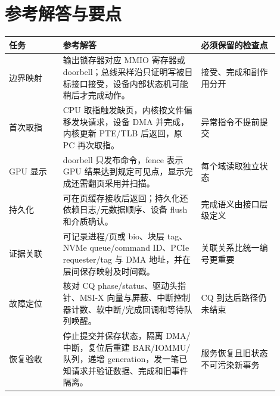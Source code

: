 \section*{参考解答与要点}

\begin{longtable}{L{0.18\linewidth}L{0.46\linewidth}L{0.26\linewidth}}
\toprule
任务 & 参考解答 & 必须保留的检查点 \\
\midrule
边界映射 & 输出锁存器对应 MMIO 寄存器或 doorbell；总线采样沿只证明写被目标接口接受，设备内部状态机可能稍后才完成动作。 & 接受、完成和副作用分开 \\
首次取指 & CPU 取指触发缺页，内核按文件偏移发块请求，设备 DMA 并完成，内核更新 PTE/TLB 后返回，原 PC 再次取指。 & 异常指令不提前提交 \\
GPU 显示 & doorbell 只发布命令，fence 表示 GPU 结果达到规定可见点，显示完成还需翻页采用并扫描。 & 每个域读取独立状态 \\
持久化 &  可在页缓存接收后返回；持久化还依赖日志/元数据顺序、设备 flush 和介质确认。 & 完成语义由接口层级定义 \\
证据关联 & 可记录进程/页或 bio、块层 tag、NVMe queue/command ID、PCIe requester/tag 与 DMA 地址，并在层间保存映射及时间戳。 & 关联关系比统一编号更重要 \\
故障定位 & 核对 CQ phase/status、驱动头指针、MSI-X 向量与屏蔽、中断控制器计数、软中断/完成回调和等待队列唤醒。 & CQ 到达后路径仍未结束 \\
恢复验收 & 停止提交并保存状态，隔离 DMA/中断，复位后重建 BAR/IOMMU/队列，递增 generation，发一笔已知请求并验证数据、完成和旧事件隔离。 & 服务恢复且旧状态不可污染新事务 \\
\bottomrule
\end{longtable}
